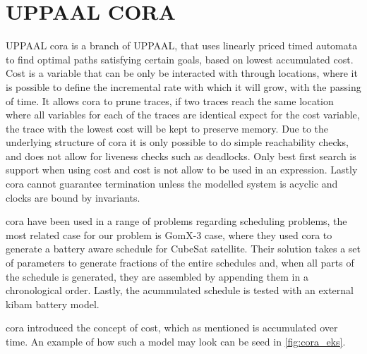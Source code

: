 \section{UPPAAL CORA}\label{sec:upp_cora}
UPPAAL \acrfull{cora} is a branch of UPPAAL, that uses linearly priced timed automata to find optimal paths satisfying certain goals, based on lowest accumulated cost\cite{cs_cora}. Cost is a variable that can be only be interacted with through locations, where it is possible to define the incremental rate with which it will grow, with the passing of time. It allows \gls{cora} to prune traces, if two traces reach the same location where all variables for each of the traces are identical expect for the cost variable, the trace with the lowest cost will be kept to preserve memory. Due to the underlying structure of \gls{cora} it is only possible to do simple reachability checks, and does not allow for liveness checks such as deadlocks. Only best first search is support when using cost and cost is not allow to be used in an expression. Lastly \gls{cora} cannot guarantee termination unless the modelled system is acyclic and clocks are bound by invariants.

\Gls{cora} have been used in a range of problems regarding scheduling problems, the most related case for our problem is GomX-3 case, where they used \gls{cora} to generate a battery aware schedule for CubeSat satellite. Their solution takes a set of parameters to generate fractions of the entire schedules and, when all parts of the schedule is generated, they are assembled by appending them in a chronological order. Lastly, the acummulated schedule is tested with an external \gls{kibam} battery model.

\Gls{cora} introduced the concept of cost, which as mentioned is accumulated over time. An example of how such a model may look can be seed in \cref{fig:cora_eks}.


